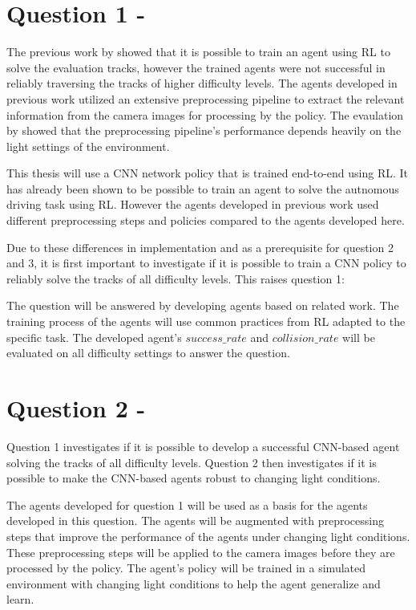 \section{Question 1 - \questionOne}

The previous work by \textcite{maximilian} showed that it is possible to train an agent using \ac{RL} to solve the evaluation tracks, however the trained agents were not successful in reliably traversing the tracks of higher difficulty levels. The agents developed in previous work utilized an extensive preprocessing pipeline to extract the relevant information from the camera images for processing by the policy. The evaulation by \textcite{merlin_flach} showed that the preprocessing pipeline's performance depends heavily on the light settings of the environment.

This thesis will use a \ac{CNN} network policy that is trained end-to-end using \ac{RL}. It has already been shown to be possible to train an agent to solve the autnomous driving task using \ac{RL}. However the agents developed in previous work used different preprocessing steps and policies compared to the agents developed here.

Due to these differences in implementation and as a prerequisite for question 2 and 3, it is first important to investigate if it is possible to train a \ac{CNN} policy to reliably solve the tracks of all difficulty levels. This raises question 1:
\questionOne

The question will be answered by developing agents based on related work. The training process of the agents will use common practices from \ac{RL} adapted to the specific task. The developed agent's $success\_rate$ and $collision\_rate$ will be evaluated on all difficulty settings to answer the question.


\section{Question 2 - \questionTwo}

Question 1 investigates if it is possible to develop a successful \ac{CNN}-based agent solving the tracks of all difficulty levels. 
Question 2 then investigates if it is possible to make the \ac{CNN}-based agents robust to changing light conditions.

The agents developed for question 1 will be used as a basis for the agents developed in this question. The agents will be augmented with preprocessing steps that improve the performance of the agents under changing light conditions. These preprocessing steps will be applied to the camera images before they are processed by the policy. The agent's policy will be trained in a simulated environment with changing light conditions to help the agent generalize and learn.

